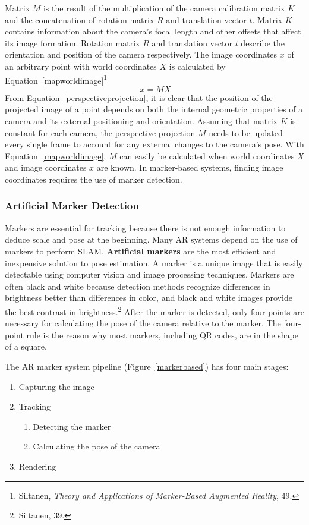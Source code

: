 Matrix $M$ is the result of the multiplication of the camera calibration matrix $K$ and the concatenation of rotation matrix $R$ and translation vector $t$. Matrix $K$ contains information about the camera's focal length and other offsets that affect its image formation. Rotation matrix $R$ and translation vector $t$ describe the orientation and position of the camera respectively. The image coordinates $x$ of an arbitrary point with world coordinates $X$ is calculated by Equation~\ref{mapworldimage}\footnote{Siltanen, \textit{Theory and Applications of Marker-Based Augmented Reality}, 49.}
\begin{equation}\label{mapworldimage}\
x = MX
\end{equation}
From Equation~\ref{perspectiveprojection}, it is clear that the position of the projected image of a point depends on both the internal geometric properties of a camera and its external positioning and orientation. Assuming that matrix $K$ is constant for each camera, the perspective projection $M$ needs to be updated every single frame to account for any external changes to the camera's pose. With Equation~\ref{mapworldimage}, $M$ can easily be calculated when world coordinates $X$ and image coordinates $x$ are known. In marker-based systems, finding image coordinates requires the use of marker detection.

\subsubsection{Artificial Marker Detection}

Markers are essential for tracking because there is not enough information to deduce scale and pose at the beginning. Many AR systems depend on the use of markers to perform SLAM. \textbf{Artificial markers} are the most efficient and inexpensive solution to pose estimation. A marker is a unique image that is easily detectable using computer vision and image processing techniques. Markers are often black and white because detection methods recognize differences in brightness better than differences in color, and black and white images provide the best contrast in brightness.\footnote{Siltanen, 39.} After the marker is detected, only four points are necessary for calculating the pose of the camera relative to the marker. The four-point rule is the reason why most markers, including QR codes, are in the shape of a square.

The AR marker system pipeline (Figure~\ref{markerbased}) has four main stages:
\begin{enumerate}
	\item Capturing the image
	\item Tracking
	\begin{enumerate}
		\item Detecting the marker
		\item Calculating the pose of the camera
	\end{enumerate}
	\item Rendering
\end{enumerate}


